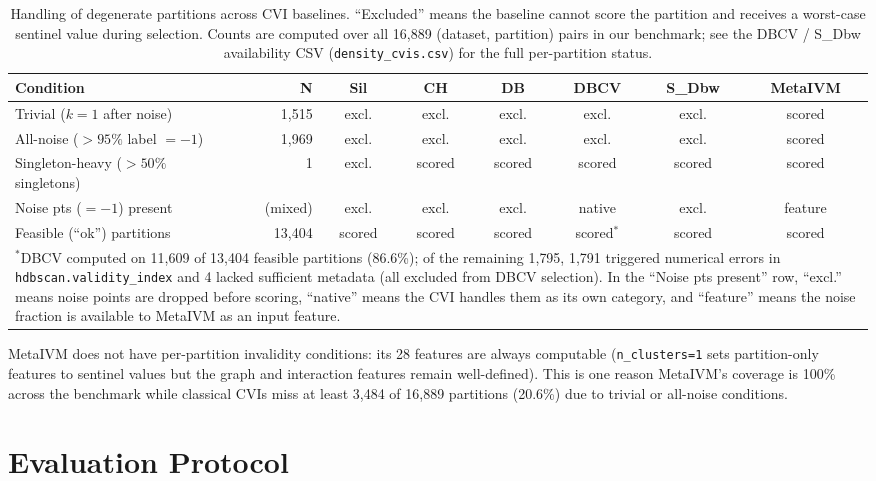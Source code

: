 \documentclass[10pt]{article} %
\begin{document}
\begin{table}[t]
\centering
\caption{Handling of degenerate partitions across CVI baselines. ``Excluded'' means the baseline cannot score the partition and receives a worst-case sentinel value during selection. Counts are computed over all 16,889 (dataset, partition) pairs in our benchmark; see the DBCV / S\_Dbw availability CSV (\texttt{density\_cvis.csv}) for the full per-partition status.}
\label{tab:degenerate}
\small
\begin{tabular}{lrcccccc}
\toprule
\textbf{Condition} & \textbf{N} & \textbf{Sil} & \textbf{CH} & \textbf{DB} & \textbf{DBCV} & \textbf{S\_Dbw} & \textbf{MetaIVM} \\
\midrule
Trivial ($k=1$ after noise) & 1{,}515 & excl. & excl. & excl. & excl. & excl. & scored \\
All-noise ($>95\%$ label $= -1$) & 1{,}969 & excl. & excl. & excl. & excl. & excl. & scored \\
Singleton-heavy ($>50\%$ singletons) & 1 & excl. & scored & scored & scored & scored & scored \\
Noise pts ($=-1$) present & (mixed) & excl. & excl. & excl. & native & excl. & feature \\
\midrule
Feasible (``ok'') partitions & 13{,}404 & scored & scored & scored & scored$^\ast$ & scored & scored \\
\bottomrule
\multicolumn{8}{p{0.98\textwidth}}{\footnotesize $^\ast$DBCV computed on 11{,}609 of 13{,}404 feasible partitions (86.6\%); of the remaining 1{,}795, 1{,}791 triggered numerical errors in \texttt{hdbscan.validity\_index} and 4 lacked sufficient metadata (all excluded from DBCV selection). In the ``Noise pts present'' row, ``excl.'' means noise points are dropped before scoring, ``native'' means the CVI handles them as its own category, and ``feature'' means the noise fraction is available to MetaIVM as an input feature.} \\
\end{tabular}
\end{table}

MetaIVM does not have per-partition invalidity conditions: its 28 features are always computable (\texttt{n\_clusters=1} sets partition-only features to sentinel values but the graph and interaction features remain well-defined). This is one reason MetaIVM's coverage is 100\% across the benchmark while classical CVIs miss at least 3{,}484 of 16{,}889 partitions (20.6\%) due to trivial or all-noise conditions.


\section{Evaluation Protocol}
\label{app:evaluation}
\end{document}
